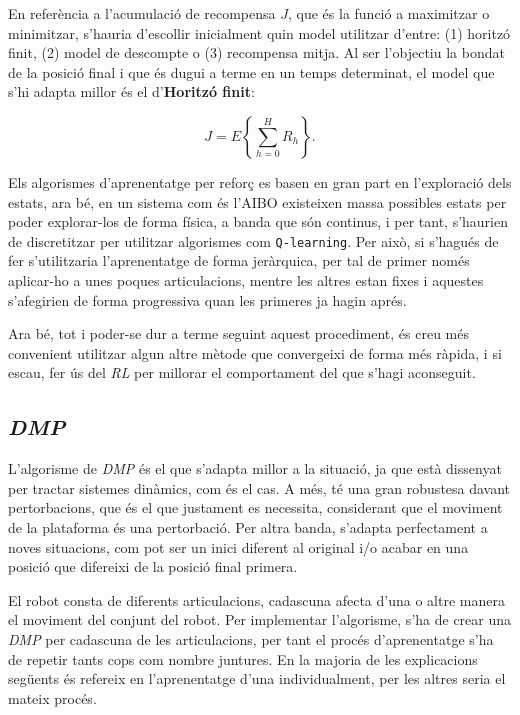 \documentclass[12pt,a4paper,final,twoside]{report}
\begin{document}
En referència a l'acumulació de recompensa $J$, que és la funció a maximitzar o minimitzar, s'hauria d'escollir inicialment quin model utilitzar d'entre: (1) horitzó finit, (2) model de descompte o (3) recompensa mitja. Al ser l'objectiu la bondat de la posició final i que és dugui a terme en un temps determinat, el model que s'hi adapta millor és el d'\textbf{Horitzó finit}:

\begin{equation}
J=E\left\{ \sum_{h=0}^{H} R_{h} \right\}.
\end{equation}

Els algorismes d'aprenentatge per reforç es basen en gran part en l'exploració dels estats, ara bé, en un sistema com és l'AIBO existeixen massa possibles estats per poder explorar-los de forma física, a banda que són continus, i per tant, s'haurien de discretitzar per utilitzar algorismes com \texttt{Q-learning}. Per això, si s'hagués de fer s'utilitzaria l'aprenentatge de forma jeràrquica, per tal de primer només aplicar-ho a unes poques articulacions, mentre les altres estan fixes i aquestes s'afegirien de forma progressiva quan les primeres ja hagin aprés. 

Ara bé, tot i poder-se dur a terme seguint aquest procediment, és creu més convenient utilitzar algun altre mètode que convergeixi de forma més ràpida, i si escau, fer ús del \textit{RL} per millorar el comportament del que s'hagi aconseguit.

\subsection{\textit{DMP}}
\label{DMP-estudis-preliminars}

L'algorisme de \textit{DMP} és el que s'adapta millor a la situació, ja que està dissenyat per tractar sistemes dinàmics, com és el cas. A més, té una gran robustesa davant pertorbacions, que és el que justament es necessita, considerant que el moviment de la plataforma és una pertorbació. Per altra banda, s'adapta perfectament a noves situacions, com pot ser un inici diferent al original i/o acabar en una posició que difereixi de la posició final primera.

El robot consta de diferents articulacions, cadascuna afecta d'una o altre manera el moviment del conjunt del robot. Per implementar l'algorisme, s'ha de crear una \textit{DMP} per cadascuna de les articulacions, per tant el procés d'aprenentatge s'ha de repetir tants cops com nombre juntures. En la majoria de les explicacions següents és refereix en l'aprenentatge d'una individualment, per les altres seria el mateix procés.
\end{document}
